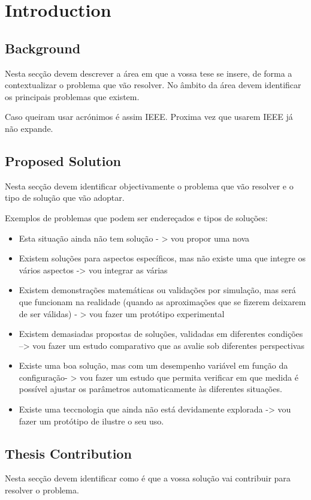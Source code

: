 \chapter{Introduction}\label{introduction}

\section{Background}
Nesta secção devem descrever a área em que a vossa tese se insere, de forma
a contextualizar o problema que vão resolver. No âmbito da área devem
identificar os principais problemas que existem.

Caso queiram usar acrónimos é assim \ac{IEEE}.
Proxima vez que usarem \ac{IEEE} já não expande.

\section{Proposed Solution}
Nesta secção devem identificar objectivamente o problema que vão resolver e o
tipo de solução que vão adoptar.

Exemplos de problemas que podem ser endereçados e tipos de soluções:

\begin{itemize}
\item Esta situação ainda não tem solução - > vou propor uma nova
\item Existem soluções para aspectos específicos, mas não existe uma que integre
os vários aspectos -> vou integrar as várias
\item Existem demonstrações matemáticas ou validações por simulação, mas
será que funcionam na realidade (quando as aproximações que se fizerem
deixarem de ser válidas) - > vou fazer um protótipo experimental
\item Existem demasiadas propostas de soluções, validadas em diferentes
condições –> vou fazer um estudo comparativo que as avalie sob diferentes
perspectivas
\item Existe uma boa solução, mas com um desempenho variável em função da
configuração- > vou fazer um estudo que permita verificar em que medida é
possível ajustar os parâmetros automaticamente às diferentes situações.
\item Existe uma teccnologia que ainda não está devidamente explorada -> vou
fazer um protótipo de ilustre o seu uso.
\end{itemize}

\section{Thesis Contribution}
Nesta secção devem identificar como é que a vossa solução vai contribuir para
resolver o problema.

